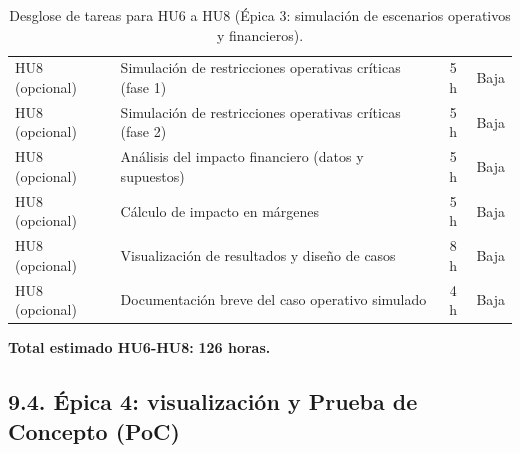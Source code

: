 \documentclass[
11pt, %
]{charter}
\begin{document}
\begin{table}[H]
\begin{tabular}{|l|p{6cm}|c|c|}
\hline
HU8 (opcional) & Simulación de restricciones operativas críticas (fase 1) & 5 h & Baja \\
HU8 (opcional) & Simulación de restricciones operativas críticas (fase 2) & 5 h & Baja \\
HU8 (opcional) & Análisis del impacto financiero (datos y supuestos) & 5 h & Baja \\
HU8 (opcional) & Cálculo de impacto en márgenes & 5 h & Baja \\
HU8 (opcional) & Visualización de resultados y diseño de casos & 8 h & Baja \\
HU8 (opcional) & Documentación breve del caso operativo simulado & 4 h & Baja \\
\hline
\end{tabular}
\caption{Desglose de tareas para HU6 a HU8 (Épica 3: simulación de escenarios operativos y financieros).}
\end{table}

\vspace{0.5cm}
\noindent
\textbf{Total estimado HU6-HU8:} \textbf{126 horas.}

\subsection*{9.4. Épica 4: visualización y Prueba de Concepto (PoC)}
\end{document}
